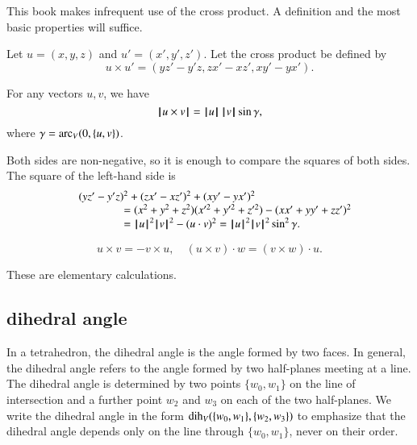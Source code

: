 This book makes infrequent use of the cross product.
A definition and the most basic properties will suffice.

\begin{definition}   Let $u =(x,y,z)$ and $u' = (x',y',z')$.  
Let the cross product be defined
by
    $$
    u \times u' = (y z' - y' z, z x' - x z', x y' - y x').
    $$
\end{definition}

\begin{lemma}  
For any vectors $u,v$, we have 
    $${{\hskip0.1em|\hskip-0.15em|\hskip0.1em}u \times v{\hskip0.1em|\hskip-0.15em|\hskip0.1em}} = {{\hskip0.1em|\hskip-0.15em|\hskip0.1em}u{\hskip0.1em|\hskip-0.15em|\hskip0.1em}}\,{{\hskip0.1em|\hskip-0.15em|\hskip0.1em}v{\hskip0.1em|\hskip-0.15em|\hskip0.1em}}\sin\gamma,$$
where $\gamma=\operatorname{arc}_V(0,\{u,v\})$.
\end{lemma}

\begin{proved}
   Both sides are non-negative, so it is enough to compare the
   squares of both sides.  The square of the left-hand side is
   $$
   \begin{array}{lll}
   &(y z'- y'z)^2 + (z x' - x z')^2 + (x y' - y x')^2 \\
    &\qquad\qquad=
   (x^2 + y^2 + z^2)(x'^2 + y'^2 + z'^2) - (x x' + y y' + z z')^2
   \\&\qquad\qquad= {{\hskip0.1em|\hskip-0.15em|\hskip0.1em}u{\hskip0.1em|\hskip-0.15em|\hskip0.1em}}^2{{\hskip0.1em|\hskip-0.15em|\hskip0.1em}v{\hskip0.1em|\hskip-0.15em|\hskip0.1em}}^2 - (u\cdot v)^2 = {{\hskip0.1em|\hskip-0.15em|\hskip0.1em}u{\hskip0.1em|\hskip-0.15em|\hskip0.1em}}^2{{\hskip0.1em|\hskip-0.15em|\hskip0.1em}v{\hskip0.1em|\hskip-0.15em|\hskip0.1em}}^2 \sin^2\gamma.
   \end{array}
   $$
\swallowed\end{proved}


\begin{lemma}
    $$
    u\times v = -v\times u,\quad
    (u\times v)\cdot w = (v\times w)\cdot u.
    $$
\end{lemma}

\begin{proved}
These are elementary calculations.
\swallowed\end{proved}



\subsection{dihedral angle}

In a tetrahedron, the dihedral angle is
the angle formed by two faces.  In general,
the dihedral angle refers to the angle formed by two half-planes
meeting at a line.  The dihedral angle is determined
by two points $\{w_0,w_1\}$ on the line of intersection
and a further point $w_2$ and $w_3$ on each of the two half-planes.
We write the dihedral angle in the form $\operatorname{dih}_V(\{w_0,w_1\},\{w_2,w_3\})$ to emphasize that the dihedral angle depends only
on the line through $\{w_0,w_1\}$, never on their order.

